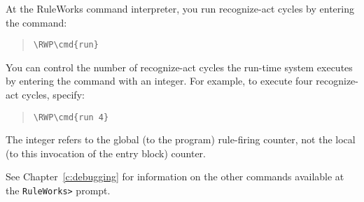 At the RuleWorks command interpreter, you run recognize-act cycles by
entering the  command:

\begin{quote}
\begin{Verbatim}[commandchars=\\\{\}]
\RWP\cmd{run}
\end{Verbatim}
\end{quote}

You can control the number of recognize-act cycles the run-time system
executes by entering the  command with an integer. For
example, to execute four recognize-act cycles, specify:

\begin{quote}
\begin{Verbatim}[commandchars=\\\{\}]
\RWP\cmd{run 4}
\end{Verbatim}
\end{quote}

The integer refers to the global (to the program) rule-firing counter,
not the local (to this invocation of the entry block) counter.

See Chapter~\ref{c:debugging} for information on the other commands
available at the \verb|RuleWorks>| prompt.

